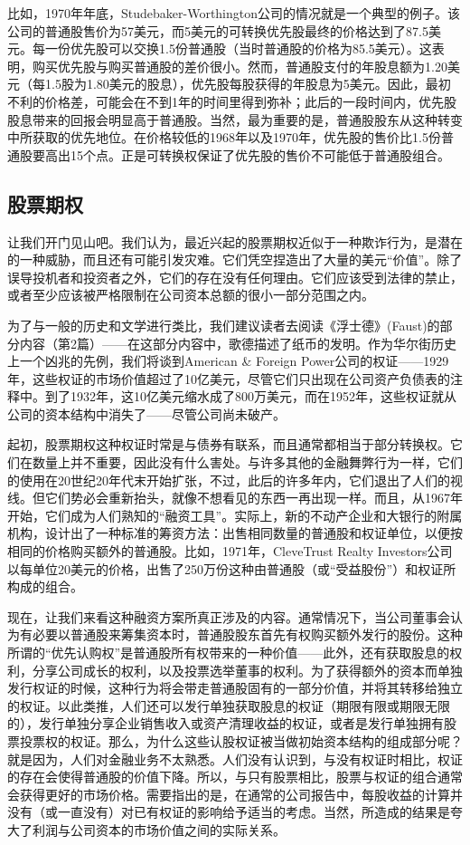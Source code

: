 \documentclass[12pt,oneside]{book}
\begin{document}
比如，1970年年底，Studebaker-Worthington公司的情况就是一个典型的例子。该公司的普通股售价为57美元，而5美元的可转换优先股最终的价格达到了87.5美元。每一份优先股可以交换1.5份普通股（当时普通股的价格为85.5美元）。这表明，购买优先股与购买普通股的差价很小。然而，普通股支付的年股息额为1.20美元（每1.5股为1.80美元的股息），优先股每股获得的年股息为5美元。因此，最初不利的价格差，可能会在不到1年的时间里得到弥补；此后的一段时间内，优先股股息带来的回报会明显高于普通股。当然，最为重要的是，普通股股东从这种转变中所获取的优先地位。在价格较低的1968年以及1970年，优先股的售价比1.5份普通股要高出15个点。正是可转换权保证了优先股的售价不可能低于普通股组合。

\subsection{股票期权}
让我们开门见山吧。我们认为，最近兴起的股票期权近似于一种欺诈行为，是潜在的一种威胁，而且还有可能引发灾难。它们凭空捏造出了大量的美元“价值”。除了误导投机者和投资者之外，它们的存在没有任何理由。它们应该受到法律的禁止，或者至少应该被严格限制在公司资本总额的很小一部分范围之内。

为了与一般的历史和文学进行类比，我们建议读者去阅读《浮士德》(Faust)的部分内容（第2篇）——在这部分内容中，歌德描述了纸币的发明。作为华尔街历史上一个凶兆的先例，我们将谈到American \& Foreign Power公司的权证——1929年，这些权证的市场价值超过了10亿美元，尽管它们只出现在公司资产负债表的注释中。到了1932年，这10亿美元缩水成了800万美元，而在1952年，这些权证就从公司的资本结构中消失了——尽管公司尚未破产。

起初，股票期权这种权证时常是与债券有联系，而且通常都相当于部分转换权。它们在数量上并不重要，因此没有什么害处。与许多其他的金融舞弊行为一样，它们的使用在20世纪20年代末开始扩张，不过，此后的许多年内，它们退出了人们的视线。但它们势必会重新抬头，就像不想看见的东西一再出现一样。而且，从1967年开始，它们成为人们熟知的“融资工具”。实际上，新的不动产企业和大银行的附属机构，设计出了一种标准的筹资方法：出售相同数量的普通股和权证单位，以便按相同的价格购买额外的普通股。比如，1971年，CleveTrust Realty Investors公司以每单位20美元的价格，出售了250万份这种由普通股（或“受益股份”）和权证所构成的组合。

现在，让我们来看这种融资方案所真正涉及的内容。通常情况下，当公司董事会认为有必要以普通股来筹集资本时，普通股股东首先有权购买额外发行的股份。这种所谓的“优先认购权”是普通股所有权带来的一种价值——此外，还有获取股息的权利，分享公司成长的权利，以及投票选举董事的权利。为了获得额外的资本而单独发行权证的时候，这种行为将会带走普通股固有的一部分价值，并将其转移给独立的权证。以此类推，人们还可以发行单独获取股息的权证（期限有限或期限无限的），发行单独分享企业销售收入或资产清理收益的权证，或者是发行单独拥有股票投票权的权证。那么，为什么这些认股权证被当做初始资本结构的组成部分呢？就是因为，人们对金融业务不太熟悉。人们没有认识到，与没有权证时相比，权证的存在会使得普通股的价值下降。所以，与只有股票相比，股票与权证的组合通常会获得更好的市场价格。需要指出的是，在通常的公司报告中，每股收益的计算并没有（或一直没有）对已有权证的影响给予适当的考虑。当然，所造成的结果是夸大了利润与公司资本的市场价值之间的实际关系。
\end{document}
